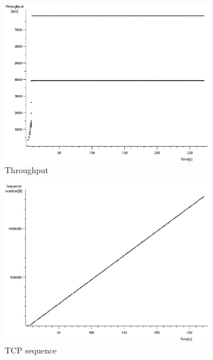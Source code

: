 \documentclass[conference,a4paper]{../../sty/IEEEtran}
\begin{document}
\begin{figure}
 \centering
 \begin{subfigure}[b]{0.2\textwidth}
  \includegraphics[width=\textwidth]{s4-3_thru}
  \caption{Throughput}
 \end{subfigure}
 \begin{subfigure}[b]{0.2\textwidth}
  \includegraphics[width=\textwidth]{s4-3_seq}
  \caption{TCP sequence}
 \end{subfigure}
 \begin{subfigure}[b]{0.2\textwidth}

\end{subfigure}
\end{figure}
\end{document}
